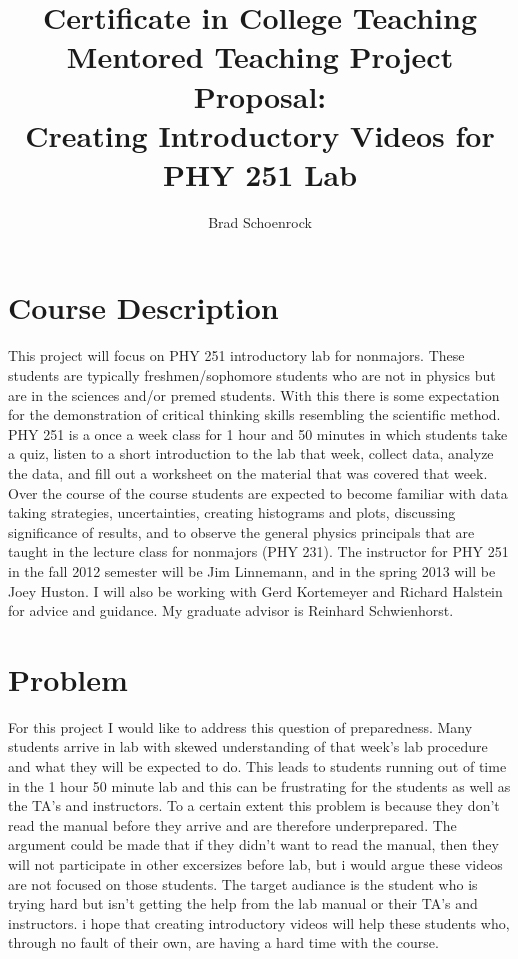 \documentclass{article}
\title{Certificate in College Teaching Mentored Teaching Project Proposal:\\Creating Introductory Videos for PHY 251 Lab}
\author{Brad Schoenrock}
\date{}
\begin{document}
\maketitle
\Large


\section{Course Description}

This project will focus on PHY 251 introductory lab for nonmajors. These students are typically freshmen/sophomore students who are not in physics but are in the sciences and/or premed students. With this there is some expectation for the demonstration of critical thinking skills resembling the scientific method. PHY 251 is a once a week class for 1 hour and 50 minutes in which students take a quiz, listen to a short introduction to the lab that week, collect data, analyze the data, and fill out a worksheet on the material that was covered that week. Over the course of the course students are expected to become familiar with data taking strategies, uncertainties, creating histograms and plots, discussing significance of results, and to observe the general physics principals that are taught in the lecture class for nonmajors (PHY 231). The instructor for PHY 251 in the fall 2012 semester will be Jim Linnemann, and in the spring 2013 will be Joey Huston. I will also be working with Gerd Kortemeyer and Richard Halstein for advice and guidance. My graduate advisor is Reinhard Schwienhorst.


\section{Problem}

For this project I would like to address this question of preparedness. Many students arrive in lab with skewed understanding of that week’s lab procedure and what they will be expected to do. This leads to students running out of time in the 1 hour 50 minute lab and this can be frustrating for the students as well as the TA's and instructors. To a certain extent this problem is because they don't read the manual before they arrive and are therefore underprepared. The argument could be made that if they didn't want to read the manual, then they will not participate in other excersizes before lab, but i would argue these videos are not focused on those students. The target audiance is the student who is trying hard but isn't getting the help from the lab manual or their TA's and instructors. i hope that creating introductory videos will help these students who, through no fault of their own, are having a hard time with the course. 
\end{document}

